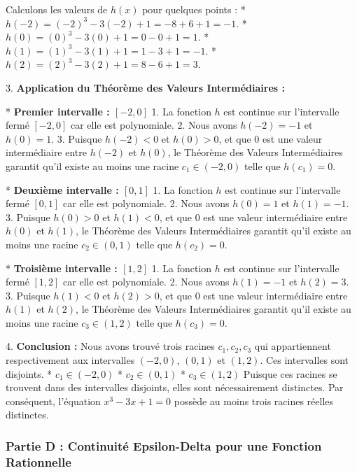 \documentclass[12pt,a4paper]{report}
\begin{document}
    Calculons les valeurs de $h(x)$ pour quelques points :
    *   $h(-2) = (-2)^3 - 3(-2) + 1 = -8 + 6 + 1 = -1$.
    *   $h(0) = (0)^3 - 3(0) + 1 = 0 - 0 + 1 = 1$.
    *   $h(1) = (1)^3 - 3(1) + 1 = 1 - 3 + 1 = -1$.
    *   $h(2) = (2)^3 - 3(2) + 1 = 8 - 6 + 1 = 3$.

3.  \textbf{Application du Théorème des Valeurs Intermédiaires :}

    *   \textbf{Premier intervalle : $[-2, 0]$}
        1.  La fonction $h$ est continue sur l'intervalle fermé $[-2, 0]$ car elle est polynomiale.
        2.  Nous avons $h(-2) = -1$ et $h(0) = 1$.
        3.  Puisque $h(-2) < 0$ et $h(0) > 0$, et que $0$ est une valeur intermédiaire entre $h(-2)$ et $h(0)$, le Théorème des Valeurs Intermédiaires garantit qu'il existe au moins une racine $c_1 \in (-2, 0)$ telle que $h(c_1) = 0$.

    *   \textbf{Deuxième intervalle : $[0, 1]$}
        1.  La fonction $h$ est continue sur l'intervalle fermé $[0, 1]$ car elle est polynomiale.
        2.  Nous avons $h(0) = 1$ et $h(1) = -1$.
        3.  Puisque $h(0) > 0$ et $h(1) < 0$, et que $0$ est une valeur intermédiaire entre $h(0)$ et $h(1)$, le Théorème des Valeurs Intermédiaires garantit qu'il existe au moins une racine $c_2 \in (0, 1)$ telle que $h(c_2) = 0$.

    *   \textbf{Troisième intervalle : $[1, 2]$}
        1.  La fonction $h$ est continue sur l'intervalle fermé $[1, 2]$ car elle est polynomiale.
        2.  Nous avons $h(1) = -1$ et $h(2) = 3$.
        3.  Puisque $h(1) < 0$ et $h(2) > 0$, et que $0$ est une valeur intermédiaire entre $h(1)$ et $h(2)$, le Théorème des Valeurs Intermédiaires garantit qu'il existe au moins une racine $c_3 \in (1, 2)$ telle que $h(c_3) = 0$.

4.  \textbf{Conclusion :}
    Nous avons trouvé trois racines $c_1, c_2, c_3$ qui appartiennent respectivement aux intervalles $(-2, 0)$, $(0, 1)$ et $(1, 2)$. Ces intervalles sont disjoints.
    *   $c_1 \in (-2, 0)$
    *   $c_2 \in (0, 1)$
    *   $c_3 \in (1, 2)$
    Puisque ces racines se trouvent dans des intervalles disjoints, elles sont nécessairement distinctes.
    Par conséquent, l'équation $x^3 - 3x + 1 = 0$ possède au moins trois racines réelles distinctes.

\subsubsection{Partie D : Continuité Epsilon-Delta pour une Fonction Rationnelle}
\end{document}
